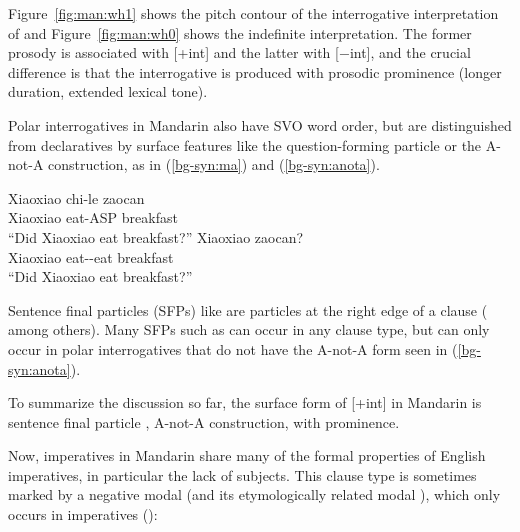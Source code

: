  Figure~\ref{fig:man:wh1} shows the pitch contour of the interrogative interpretation of \twh{} and Figure~\ref{fig:man:wh0} shows the indefinite interpretation. The former prosody is associated with [+int] and the latter with [$-$int], and the crucial difference is that the interrogative  is produced with prosodic prominence (longer duration, extended lexical tone). 

Polar interrogatives in Mandarin also have SVO word order, but are distinguished from declaratives by surface features like the question-forming particle  or the A-not-A construction, as in (\ref{bg-syn:ma}) and (\ref{bg-syn:anota}).

\gll Xiaoxiao	chi-le	zaocan		\\
Xiaoxiao	eat-ASP	breakfast	\Sfp{}\\
``Did Xiaoxiao eat breakfast?''
\eex
{}
\gll Xiaoxiao		zaocan?\\
	Xiaoxiao	eat-\Neg-eat	breakfast\\
	``Did Xiaoxiao eat breakfast?''
\eex


Sentence final particles (SFPs) like \ma{} are  particles at the right edge of a clause (\citealt{chao1968, zhudexi, huang1982, cheng1991, liboya2006} among others). Many SFPs such as  can occur in any clause type, but \ma{} can only occur in polar interrogatives that do not have the A-not-A form seen in (\ref{bg-syn:anota}). 

To summarize the discussion so far, the surface form of [+int] in Mandarin is sentence final particle \ma{}, A-not-A construction, \twh{} with prominence. 

Now, imperatives in Mandarin share many of the formal properties of English imperatives, in particular the lack of subjects. This clause type is sometimes marked by a negative modal  (and its etymologically related modal ), which only occurs in imperatives (\cite{chao1968, lithompson}):

